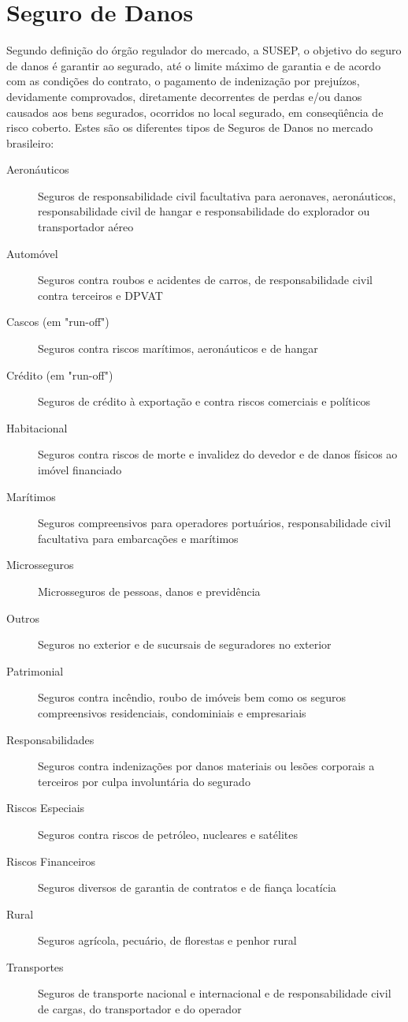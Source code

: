 \documentclass[../../relatorio.tex]{subfiles}
\begin{document}
\section{Seguro de Danos}

Segundo definição do órgão regulador do mercado, a SUSEP, o objetivo do seguro de danos é garantir ao segurado, até o limite máximo de garantia e de acordo com as condições do contrato, o pagamento de indenização por prejuízos, devidamente comprovados, diretamente decorrentes de perdas e/ou danos causados aos bens segurados, ocorridos no local segurado, em conseqüência de risco coberto. Estes são os diferentes tipos de Seguros de Danos no mercado brasileiro:

\begin{description}
  \item[Aeronáuticos] Seguros de responsabilidade civil facultativa para aeronaves, aeronáuticos, responsabilidade civil de hangar e responsabilidade do explorador ou transportador aéreo
  \item[Automóvel] Seguros contra roubos e acidentes de carros, de responsabilidade civil contra terceiros e DPVAT
  \item[Cascos (em "run-off")] Seguros contra riscos marítimos, aeronáuticos e de hangar
  \item[Crédito (em "run-off")] Seguros de crédito à exportação e contra riscos comerciais e políticos
  \item[Habitacional] Seguros contra riscos de morte e invalidez do devedor e de danos físicos ao imóvel financiado
  \item[Marítimos] Seguros compreensivos para operadores portuários, responsabilidade civil facultativa para embarcações e marítimos
  \item[Microsseguros] Microsseguros de pessoas, danos e previdência
  \item[Outros] Seguros no exterior e de sucursais de seguradores no exterior
  \item[Patrimonial] Seguros contra incêndio, roubo de imóveis bem como os seguros compreensivos residenciais, condominiais e empresariais
  \item[Responsabilidades] Seguros contra indenizações por danos materiais ou lesões corporais a terceiros por culpa involuntária do segurado
  \item[Riscos Especiais] Seguros contra riscos de petróleo, nucleares e satélites
  \item[Riscos Financeiros] Seguros diversos de garantia de contratos e de fiança locatícia
  \item[Rural] Seguros agrícola, pecuário, de florestas e penhor rural
  \item[Transportes] Seguros de transporte nacional e internacional e de responsabilidade civil de cargas, do transportador e do operador
\end{description}
\end{document}
